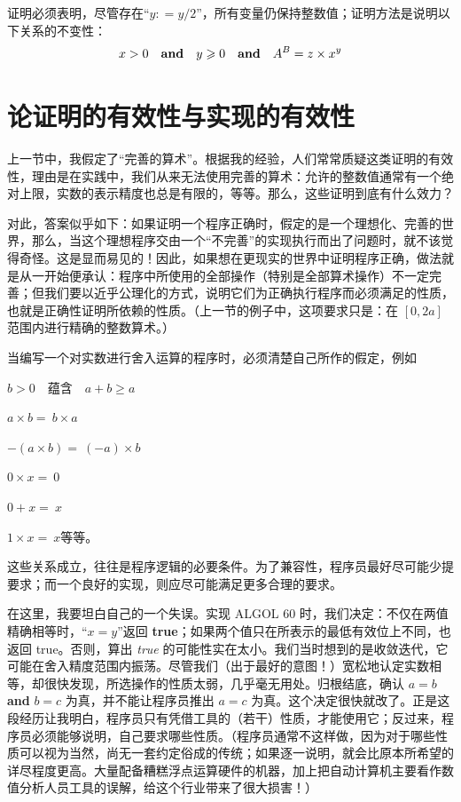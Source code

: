\documentclass[twoside,11pt,fontset=none]{ctexbook}
\begin{document}
证明必须表明，尽管存在“$y: = y/2$”，所有变量仍保持整数值；证明方法是说明以下关系的不变性：
$$
x > 0\quad \text{\textbf{and}}\quad y \geqslant 0\quad \text{\textbf{and}}\quad A^B = z \times x^y
$$

\section[论证明的有效性与实现的有效性]{论证明的有效性与实现的有效性}

上一节中，我假定了“完善的算术”。根据我的经验，人们常常质疑这类证明的有效性，理由是在实践中，我们从来无法使用完善的算术：允许的整数值通常有一个绝对上限，实数的表示精度也总是有限的，等等。那么，这些证明到底有什么效力？

对此，答案似乎如下：如果证明一个程序正确时，假定的是一个理想化、完善的世界，那么，当这个理想程序交由一个“不完善”的实现执行而出了问题时，就不该觉得奇怪。这是显而易见的！因此，如果想在更现实的世界中证明程序正确，做法就是从一开始便承认：程序中所使用的全部操作（特别是全部算术操作）不一定完善；但我们要以近乎公理化的方式，说明它们为正确执行程序而必须满足的性质，也就是正确性证明所依赖的性质。（上一节的例子中，这项要求只是：在 $[0, 2a]$ 范围内进行精确的整数算术。）

当编写一个对实数进行舍入运算的程序时，必须清楚自己所作的假定，例如
\smallskip

\tabto*{10em}$b > 0\quad \text{蕴含}\quad a + b \geqslant a$

\tabto*{10em}$a\times b =\ b\times a$

\tabto*{10em}$-(a \times  b) =\ (-a)\times b$

\tabto*{10em}$0\times  x =\ 0$

\tabto*{10em}$0 + x =\ x$

\tabto*{10em}$1\times x =\ x$\quad 等等。
\smallskip

这些关系成立，往往是程序逻辑的必要条件。为了兼容性，程序员最好尽可能少提要求；而一个良好的实现，则应尽可能满足更多合理的要求。

在这里，我要坦白自己的一个失误。实现 ALGOL 60 时，我们决定：不仅在两值精确相等时，“$x = y$”返回 \textbf{true}；如果两个值只在所表示的最低有效位上不同，也返回 true。否则，算出 \textit{true} 的可能性实在太小。我们当时想到的是收敛迭代，它可能在舍入精度范围内振荡。尽管我们（出于最好的意图！）宽松地认定实数相等，却很快发现，所选操作的性质太弱，几乎毫无用处。归根结底，确认 $a = b$ \textbf{and} $b = c$ 为真，并不能让程序员推出 $a = c$ 为真。这个决定很快就改了。正是这段经历让我明白，程序员只有凭借工具的（若干）性质，才能使用它；反过来，程序员必须能够说明，自己要求哪些性质。（程序员通常不这样做，因为对于哪些性质可以视为当然，尚无一套约定俗成的传统；如果逐一说明，就会比原本所希望的详尽程度更高。大量配备糟糕浮点运算硬件的机器，加上把自动计算机主要看作数值分析人员工具的误解，给这个行业带来了很大损害！）
\end{document}
